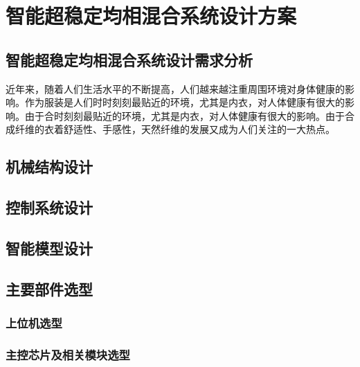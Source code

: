 \chapter{智能超稳定均相混合系统设计方案}
\label{chap:intro}
\section{智能超稳定均相混合系统设计需求分析}

近年来，随着人们生活水平的不断提高，人们越来越注重周围环境对身体健康的影响。作为服装是人们时时刻刻最贴近的环境，尤其是内衣，对人体健康有很大的影响。由于合时刻刻最贴近的环境，尤其是内衣，对人体健康有很大的影响。由于合成纤维的衣着舒适性、手感性，天然纤维的发展又成为人们关注的一大热点。\supercite{Takahashi1996Structure,Xia2002Analysis,Jiang1989,Mao2000Motion,Feng1998}

\section{机械结构设计}


\section{控制系统设计}

\section{智能模型设计}

\section{主要部件选型}

\subsection{上位机选型}

\subsection{主控芯片及相关模块选型}

